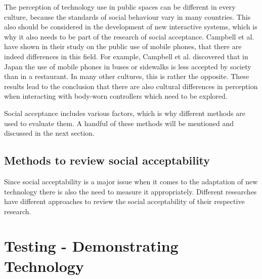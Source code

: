 \documentclass{sigchi}
\begin{document}
The perception of technology use in public spaces can be different in every culture, because the standards of social behaviour vary in many countries. This also should be considered in the development of new interactive systems, which is why it also needs to be part of the research of social acceptance. Campbell et al. have shown in their study on the public use of mobile phones, that there are indeed differences in this field. For example, Campbell et al. discovered that in Japan the use of mobile phones in buses or sidewalks is less accepted by society than in a restaurant. In many other cultures, this is rather the opposite. \cite{mobile-phones} These results lead to the conclusion that there are also cultural differences in perception when interacting with body-worn controllers which need to be explored.

Social acceptance includes various factors, which is why different methods are used to evaluate them. A handful of these methods will be mentioned and discussed in the next section.

\subsection{Methods to review social acceptability}
%

Since social acceptability is a major issue when it comes to the adaptation of new technology there is also the need to measure it appropriately. Different researches have different approaches to review the social acceptability of their respective research. \cite{touch-wrist}

\section{Testing - Demonstrating Technology}
\end{document}
